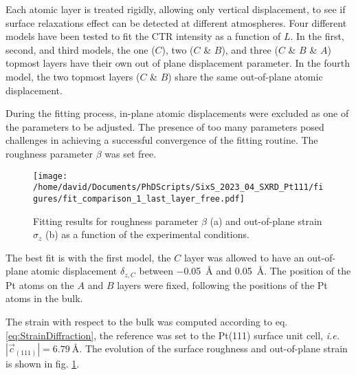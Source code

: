 Each atomic layer is treated rigidly, allowing only vertical displacement, to see if surface relaxations effect can be detected at different atmospheres.
Four different models have been tested to fit the CTR intensity as a function of $L$.
In the first, second, and third models, the one ($C$), two ($C$ \& $B$), and three ($C$ \& $B$ \& $A$) topmost layers have their own out of plane displacement parameter.
In the fourth model, the two topmost layers ($C$ \& $B$) share the same out-of-plane atomic displacement.

During the fitting process, in-plane atomic displacements were excluded as one of the parameters to be adjusted.
The presence of too many parameters posed challenges in achieving a successful convergence of the fitting routine.
The roughness parameter $\beta$ was set free.

\begin{figure}[!htb]
    \centering
    \texttt{[image: /home/david/Documents/PhDScripts/SixS\_2023\_04\_SXRD\_Pt111/figures/fit\_comparison\_1\_last\_layer\_free.pdf]}
    \caption{
        Fitting results for roughness parameter $\beta$ (a) and out-of-plane strain $\sigma_z$ (b) as a function of the experimental conditions.
    }
    \label{fig:CTRFit111}
\end{figure}

The best fit is with the first model, the $C$ layer was allowed to have an out-of-plane atomic displacement $\delta_{z, C}$ between \qty{-0.05}{\angstrom} and \qty{0.05}{\angstrom}.
The position of the Pt atoms on the $A$ and $B$ layers were fixed, following the positions of the Pt atoms in the bulk.

The strain with respect to the bulk was computed according to eq. \ref{eq:StrainDiffraction}, the reference was set to the Pt(111) surface unit cell, \textit{i.e.} $|\vec{c}_{(111)}| = \qty{6.79}{\angstrom}$.
The evolution of the surface roughness and out-of-plane strain is shown in fig. \ref{fig:CTRFit111}.

